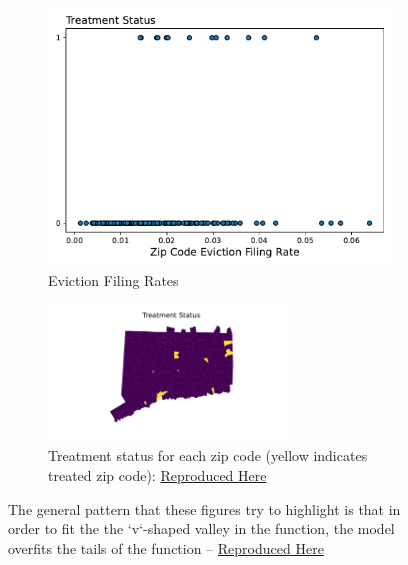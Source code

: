 \documentclass[a4paper,12pt]{article}
\begin{document}
\begin{figure}[htbp]
\centering
\begin{subfigure}{.48\textwidth}
    \centering
    \includegraphics[width=.95\linewidth]{figures/rtc/context/eviction_filing_rate_per_pop.pdf}
    \caption{Eviction Filing Rates}
    \label{fig:efr}
\end{subfigure}
\begin{subfigure}{.48\textwidth}
    \centering
\includegraphics[width=0.7\textwidth]{figures/rtc/maps/zip_code_status.pdf}  
        \caption{Treatment status for each zip code (yellow indicates treated zip code): \href{https://github.com/pharringtonp19/evictions/blob/main/scripts/joint/maps/treatment_status.py}{Reproduced Here}}
\end{subfigure}
\caption{The general pattern that these figures try to highlight is that in order to fit the the `v`-shaped valley in the function, the model overfits the tails of the function -- \href{https://github.com/pharringtonp19/jmp_paper/blob/main/notebooks/gradient_descent_motivating_example.ipynb}{Reproduced Here}}
\end{figure}
\end{document}

